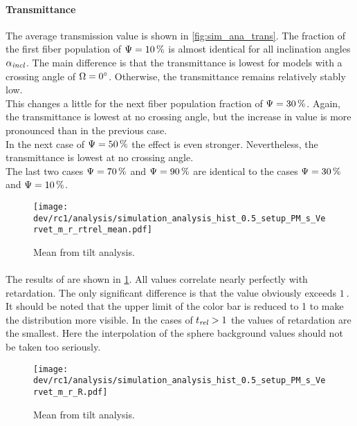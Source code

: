 \paragraph{Transmittance}
The average transmission value is shown in \cref{fig:sim_ana_trans}.
The fraction of the first fiber population of $\textnormal{$\Psi$}=\SI{10}{\percent}$ is almost identical for all inclination angles $\textnormal{$\alpha_{\mathit{incl}}$}$.
The main difference is that the transmittance is lowest for models with a crossing angle of $\textnormal{$\Omega$} = \SI{0}{\degree}$.
Otherwise, the transmittance remains relatively stably low.
\\
% 
This changes a little for the next fiber population fraction of $\textnormal{$\Psi$}=\SI{30}{\percent}$.
Again, the transmittance is lowest at no crossing angle, but the increase in value is more pronounced than in the previous case.
\\
% 
In the next case of $\textnormal{$\Psi$}=\SI{50}{\percent}$ the effect is even stronger.
Nevertheless, the transmittance is lowest at no crossing angle.
\\
% 
The last two cases $\textnormal{$\Psi$}=\SI{70}{\percent}$ and $\textnormal{$\Psi$}=\SI{90}{\percent}$ are identical to the cases $\textnormal{$\Psi$}=\SI{30}{\percent}$ and $\textnormal{$\Psi$}=\SI{10}{\percent}$.
% 
% 
% 
\begin{figure}[!p]
\centering
\texttt{[image: dev/rc1/analysis/simulation\_analysis\_hist\_0.5\_setup\_PM\_s\_Vervet\_m\_r\_rtrel\_mean.pdf]} 
\caption[Simulation \trel{}]{Mean \trel{} from tilt analysis.}
\label{fig:sim_ana_trel}
\end{figure}
% 
\paragraph{\trel}
The results of \trel{} are shown in \cref{fig:sim_ana_trel}.
All values correlate nearly perfectly with retardation.
The only significant difference is that the \trel{} value obviously exceeds $\SI{1}{}$.
It should be noted that the upper limit of the color bar is reduced to 1 to make the distribution more visible.
In the cases of $\textnormal{$t_\mathit{rel}$} > \SI{1}{}$ the values of retardation are the smallest.
Here the interpolation of the sphere background values should not be taken too seriously.
% 
% 
% 
\begin{figure}[!p]
\centering
\texttt{[image: dev/rc1/analysis/simulation\_analysis\_hist\_0.5\_setup\_PM\_s\_Vervet\_m\_r\_R.pdf]} 
\caption[Simulation \rvalue]{Mean \rvalue{} from tilt analysis.}
\label{fig:sim_ana_rvalue}
\end{figure}
% 

